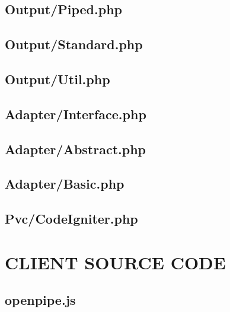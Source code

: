 \documentclass[12pt]{report}
\newcommand{\rootPath}{../../}
\newcommand{\rootServerPath}{\rootPath server/}
\newcommand{\rootServerPhpPath}{\rootServerPath php/}
\newcommand{\rootClientPath}{\rootPath client/}
\newcommand{\rootClientJsPath}{\rootClientPath js/}
\newcommand{\phplist}[1]{}
\newcommand{\jslist}[1]{}
\begin{document}
\section{Output/Piped.php} 
\phplist{OpenPipe/Output/Piped.php}

\section{Output/Standard.php} 
\phplist{OpenPipe/Output/Standard.php}

\section{Output/Util.php} 
\phplist{OpenPipe/Output/Util.php}

\section{Adapter/Interface.php} 
\phplist{OpenPipe/Adapter/Interface.php}

\section{Adapter/Abstract.php} 
\phplist{OpenPipe/Adapter/Abstract.php}

\section{Adapter/Basic.php} 
\phplist{OpenPipe/Adapter/Basic.php}

\section{Pvc/CodeIgniter.php} 
\phplist{OpenPipe/Adapter/Pvc/CodeIgniter.php}

\chapter{CLIENT SOURCE CODE}

\section{openpipe.js} 
\jslist{openpipe.js}
\end{document}
